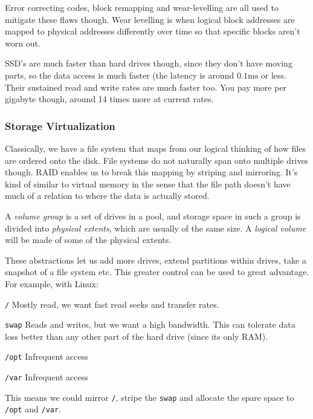 Error correcting codes, block remapping and wear-levelling are all used to
mitigate these flaws though. Wear levelling is when logical block addresses are
mapped to physical addresses differently over time so that specific blocks
aren't worn out.

SSD's are much faster than hard drives though, since they don't have moving
parts, so the data access is much faster (the latency is around
$0.1\si{\milli\second}$ or less. Their sustained read and write rates are much
faster too. You pay more per gigabyte though, around 14 times more at current
rates.

\subsubsection{Storage Virtualization}

Classically, we have a file system that maps from our logical thinking of how
files are ordered onto the disk. File systems do not naturally span onto
multiple drives though. RAID enables us to break this mapping by striping and
mirroring. It's kind of similar to virtual memory in the sense that the file
path doesn't have much of a relation to where the data is actually stored.

A \textit{volume group} is a set of drives in a pool, and storage space in such
a group is divided into \textit{physical extents}, which are usually of the same
size. A \textit{logical volume} will be made of some of the physical extents.

These abstractions let us add more drives, extend partitions within drives, take
a snapshot of a file system etc. This greater control can be used to great
advantage. For example, with Linux:

\begin{description}
  \item \texttt{/} Mostly read, we want fast read seeks and transfer rates.
  \item \texttt{swap} Reads and writes, but we want a high bandwidth. This can
  tolerate data loss better than any other part of the hard drive (since its
  only RAM).
  \item \texttt{/opt} Infrequent access
  \item \texttt{/var} Infrequent access
\end{description}

This means we could mirror \texttt{/}, stripe the \texttt{swap} and allocate the
spare space to \texttt{/opt} and \texttt{/var}.

